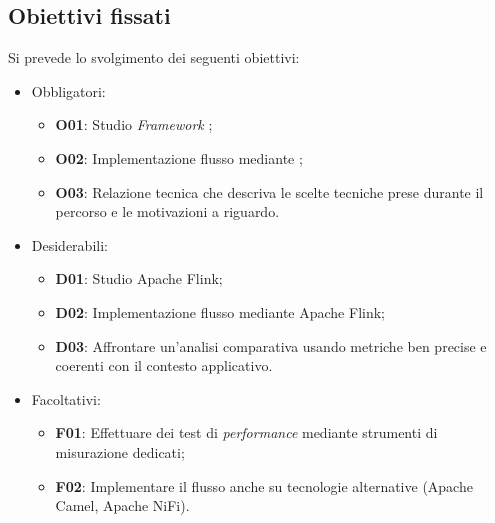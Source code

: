 \subsection*{Obiettivi fissati}
\label{Obiettivi fissati}
Si prevede lo svolgimento dei seguenti obiettivi:
\begin{itemize}
    \item Obbligatori:
    \begin{itemize}
        \item \textbf{O01}: Studio \textit{\gls{Framework}} ;
        \item \textbf{O02}: Implementazione flusso mediante ;
        \item \textbf{O03}: Relazione tecnica che descriva le scelte tecniche prese durante il percorso e le motivazioni a riguardo.
    \end{itemize}
    \item Desiderabili:
    \begin{itemize}
        \item \textbf{D01}: Studio Apache Flink;
        \item \textbf{D02}: Implementazione flusso mediante Apache Flink;
        \item \textbf{D03}: Affrontare un'analisi comparativa usando metriche ben precise e coerenti con il contesto applicativo.
    \end{itemize}
    \item Facoltativi:
    \begin{itemize}
        \item \textbf{F01}: Effettuare dei test di \textit{performance} mediante strumenti di misurazione dedicati;
        \item \textbf{F02}: Implementare il flusso anche su tecnologie alternative (Apache Camel, Apache NiFi).
    \end{itemize}
\end{itemize}

